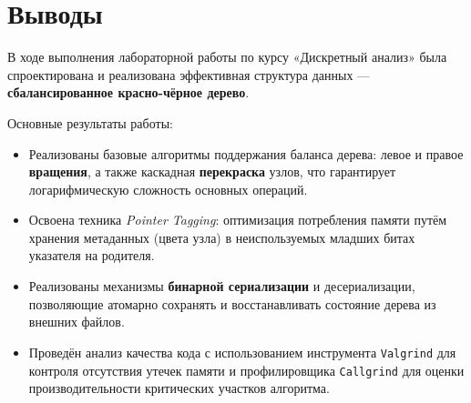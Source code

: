 \section{Выводы}

В ходе выполнения лабораторной работы по курсу «Дискретный анализ» была спроектирована и реализована эффективная структура данных — \textbf{сбалансированное красно-чёрное дерево}. 

Основные результаты работы:
\begin{itemize}
    \item Реализованы базовые алгоритмы поддержания баланса дерева: левое и правое \textbf{вращения}, а также каскадная \textbf{перекраска} узлов, что гарантирует логарифмическую сложность основных операций.
    \item Освоена техника \textit{Pointer Tagging}: оптимизация потребления памяти путём хранения метаданных (цвета узла) в неиспользуемых младших битах указателя на родителя.
    \item Реализованы механизмы \textbf{бинарной сериализации} и десериализации, позволяющие атомарно сохранять и восстанавливать состояние дерева из внешних файлов.
    \item Проведён анализ качества кода с использованием инструмента \texttt{Valgrind} для контроля отсутствия утечек памяти и профилировщика \texttt{Callgrind} для оценки производительности критических участков алгоритма.
\end{itemize}